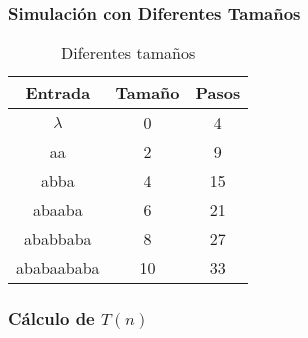 \documentclass{uc3mpracticas}
\begin{document}
  \newpage
  \subsubsection{Simulación con Diferentes Tamaños}

  \begin{table}[!h]
    \centering
  \begin{tabular}{|c|c|c|}
  \hline

  \textbf{Entrada} & \textbf{Tamaño} & \textbf{Pasos} \\ \hline

  $\lambda$           & 0               & 4              \\ \hline
  aa               & 2               & 9              \\ \hline
  abba             & 4               & 15             \\ \hline
  abaaba           & 6               & 21             \\ \hline
  ababbaba         & 8               & 27             \\ \hline
  ababaababa       & 10              & 33             \\ \hline
  \end{tabular}
  \caption{Diferentes tamaños}
  \end{table}






  \subsubsection{Cálculo de $T(n)$}
\end{document}
